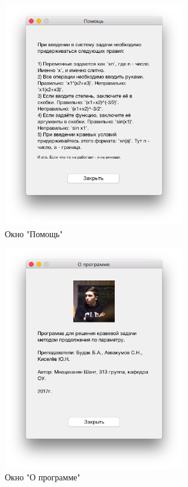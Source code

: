 \documentclass[oneside,final,12pt]{extreport}
\begin{document}
\begin{figure}[h]
	\centering
	\includegraphics[width=0.7\textwidth]{6}
	\caption{Окно "Помощь"}
	\label{gr1}
\end{figure}

\begin{figure}[h]
	\centering
	\includegraphics[width=0.7\textwidth]{7}
	\caption{Окно "О программе"}
	\label{gr1}
\end{figure}
\end{document}
